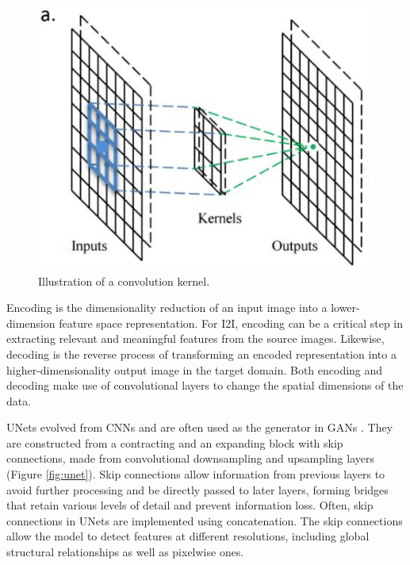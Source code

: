 \documentclass[10pt,twocolumn]{article}
\begin{document}
\begin{figure}[h]
	\centering
        \includegraphics[scale=0.3]{cnn-kernel}
	\caption{Illustration of a convolution kernel.}
	\label{fig:cnn}
\end{figure}

Encoding is the dimensionality reduction of an input image into a lower-dimension feature space representation. For I2I, encoding can be a critical step in extracting relevant and meaningful features from the source images. Likewise, decoding is the reverse process of transforming an encoded representation into a higher-dimensionality output image in the target domain. Both encoding and decoding make use of convolutional layers to change the spatial dimensions of the data.

UNets evolved from CNNs and are often used as the generator in GANs \cite{unet}. They are constructed from a contracting and an expanding block with skip connections, made from convolutional downsampling and upsampling layers (Figure \ref{fig:unet}). Skip connections allow information from previous layers to avoid further processing and be directly passed to later layers, forming bridges that retain various levels of detail and prevent information loss. Often, skip connections in UNets are implemented using concatenation. The skip connections allow the model to detect features at different resolutions, including global structural relationships as well as pixelwise ones.
\end{document}

